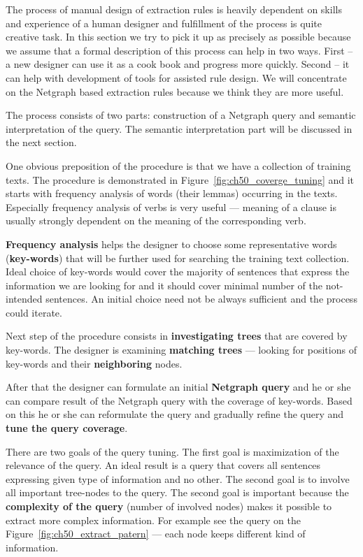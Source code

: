 The process of manual design of extraction rules is heavily dependent on skills and experience of a human designer and fulfillment of the process is quite creative task. In this section we try to pick it up as precisely as possible because we assume that a formal description of this process can help in two ways. First -- a new designer can use it as a cook book and progress more quickly. Second -- it can help with development of tools for assisted rule design. We will concentrate on the Netgraph based extraction rules because we think they are more useful.

The process consists of two parts: construction of a Netgraph query and semantic interpretation of the query. The semantic interpretation part will be discussed in the next section.

One obvious preposition of the procedure is that we have a collection of training texts.
The procedure is demonstrated in Figure~\ref{fig:ch50_coverge_tuning} and it starts with frequency analysis of words (their lemmas) occurring in the texts. Especially frequency analysis of verbs is very useful --- meaning of a clause is usually strongly dependent on the meaning of the corresponding verb.

\textbf{Frequency analysis} helps the designer to choose some representative words (\textbf{key-words}) that will be further used for searching the training text collection. Ideal choice of key-words would cover the majority of sentences that express the information we are looking for and it should cover minimal number of the not-intended sentences. An initial choice need not be always sufficient and the process could iterate.

Next step of the procedure consists in \textbf{investigating trees} that are covered by key-words. The designer is examining \textbf{matching trees} --- looking for positions of key-words and their \textbf{neighboring} nodes.

After that the designer can formulate an initial \textbf{Netgraph query} and he or she can compare result of the Netgraph query with the coverage of key-words. Based on this he or she can reformulate the query and gradually refine the query and \textbf{tune the query coverage}.

There are two goals of the query tuning. The first goal is maximization of the relevance of the query. An ideal result is a query that covers all sentences expressing given type of information and no other. The second goal is to involve all important tree-nodes to the query. The second goal is important because the \textbf{complexity of the query} (number of involved nodes) makes it possible to extract more complex information. For example see the query on the Figure~\ref{fig:ch50_extract_patern} --- each node keeps different kind of information.


